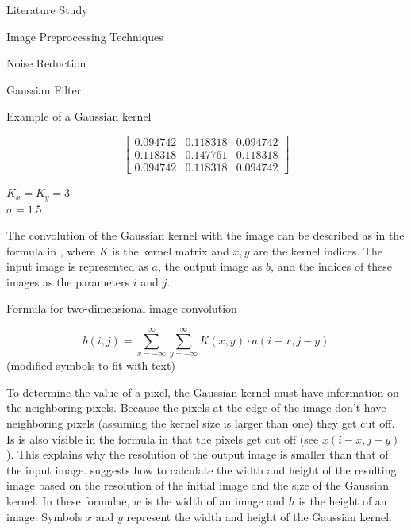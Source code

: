 \documentclass{matthijs}
\begin{document}
\begin{hoofdstuk}{Literature Study}
\begin{paragraaf}{Image Preprocessing Techniques}
\begin{subparagraaf}{Noise Reduction}
\begin{subsubparagraaf}{Gaussian Filter}
					\begin{figuur}{Example of a Gaussian kernel}

						\vspace{-2ex}%

						\begin{equation*}
							\begin{bmatrix}
								0.094742 & 0.118318 & 0.094742 \\
								0.118318 & 0.147761 & 0.118318 \\
								0.094742 & 0.118318 & 0.094742 
							\end{bmatrix}
						\end{equation*}

						$K_x = K_y = 3$ \\
						$\sigma = 1.5$
					
					\end{figuur}
					
					\bigskip

					The convolution of the Gaussian kernel with the image can be described as in the formula in , where $K$ is the kernel matrix and $x,y$ are the kernel indices.
					The input image is represented as $a$, the output image as $b$, and the indices of these images as the parameters $i$ and $j$.
					
					\begin{figuur}{Formula for two-dimensional image convolution}

						\begin{equation*}
							b(i, j) = \sum_{x = -\infty}^{\infty} \sum_{y = -\infty}^{\infty} K(x, y) \cdot a(i - x, j - y)
						\end{equation*}
						\cite{sneha2018convolution} (modified symbols to fit with text)
					
					\end{figuur}

					\bigskip

					To determine the value of a pixel, the Gaussian kernel must have information on the neighboring pixels.
					Because the pixels at the edge of the image don't have neighboring pixels (assuming the kernel size is larger than one) they get cut off.
					Is is also visible in the formula in  that the pixels get cut off (see $x(i-x, j-y)$).
					This explains why the resolution of the output image is smaller than that of the input image.
					 suggests how to calculate the width and height of the resulting image based on the resolution of the initial image and the size of the Gaussian kernel.
					In these formulae, $w$ is the width of an image and $h$ is the height of an image.
					Symbols $x$ and $y$ represent the width and height of the Gaussian kernel.


\end{subsubparagraaf}
\end{subparagraaf}
\end{paragraaf}
\end{hoofdstuk}
\end{document}
